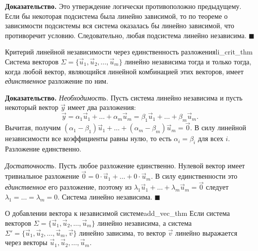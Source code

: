 \documentclass[12pt,a4paper]{article}
\newenvironment{myproof}{\noindent\textbf{Доказательство.}}{\hfill$\blacksquare$}
\begin{document}
\begin{myproof}
  Это утверждение логически противоположно предыдущему. Если бы некоторая
  подсистема была линейно зависимой, то по теореме о зависимости
  подсистемы вся система оказалась бы линейно зависимой, что противоречит
  условию. Следовательно, любая подсистема линейно независима.
\end{myproof}

\begin{theorem}{Критерий линейной независимости через единственность
  разложения}{li_crit_thm}
  Система векторов $\Sigma = \{\vec{u}_1, \vec{u}_2, \dots, \vec{u}_m\}$
  линейно независима тогда и только тогда, когда любой вектор, являющийся
  линейной комбинацией этих векторов, имеет \emph{единственное} разложение
  по ним.
\end{theorem}

\begin{myproof}
  \textit{Необходимость.} Пусть система линейно независима и пусть
  некоторый вектор $\vec{y}$ имеет два разложения:
  \[
    \vec{y} = \alpha_1 \vec{u}_1 + \dots + \alpha_m \vec{u}_m =
    \beta_1 \vec{u}_1 + \dots + \beta_m \vec{u}_m.
  \]
  Вычитая, получим $(\alpha_1 - \beta_1)\vec{u}_1 + \dots + (\alpha_m -
  \beta_m)\vec{u}_m = \vec{0}$. В силу линейной независимости все
  коэффициенты равны нулю, то есть $\alpha_i = \beta_i$ для всех $i$.
  Разложение единственно.

  \textit{Достаточность.} Пусть любое разложение единственно. Нулевой
  вектор имеет тривиальное разложение $\vec{0} = 0\cdot\vec{u}_1 + \dots +
  0\cdot\vec{u}_m$. В силу единственности это \emph{единственное} его
  разложение, поэтому из $\lambda_1 \vec{u}_1 + \dots + \lambda_m
  \vec{u}_m = \vec{0}$ следует $\lambda_1 = \dots = \lambda_m = 0$. Система
  линейно независима.
\end{myproof}

\begin{theorem}{О добавлении вектора к независимой системе}{add_vec_thm}
  Если система векторов $\Sigma = \{\vec{u}_1, \vec{u}_2, \dots,
  \vec{u}_m\}$ линейно независима, а система $\Sigma' = \{\vec{u}_1,
  \vec{u}_2, \dots, \vec{u}_m, \vec{v}\}$ линейно зависима, то вектор
  $\vec{v}$ линейно выражается через векторы $\vec{u}_1, \vec{u}_2, \dots,
  \vec{u}_m$.
\end{theorem}
\end{document}
